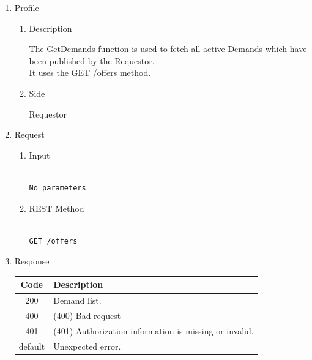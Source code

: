 \begin{enumerate}

\item Profile

\begin{enumerate}

\item Description

The GetDemands function is used to fetch all active Demands which have been published by the Requestor. \\ 
It uses the GET /offers method.

\item Side

Requestor

\end{enumerate}

\item Request

\begin{enumerate}

\item Input

\begin{tcolorbox}[boxrule=0pt, frame empty]
\begin{verbatim}

No parameters

\end{verbatim}
\end{tcolorbox}

\item REST Method

\begin{tcolorbox}[boxrule=0pt, frame empty]
\begin{verbatim} 

GET /offers

\end{verbatim}
\end{tcolorbox}

\end{enumerate}

\item Response

\begin{center}
\begin{tabular}{|c|l|} 
\hline
\rowcolor{lightgray}	Code 		& 	Description \\
\hline
200	 		&	Demand list. \\
\hline
400			&	(400) Bad request \\
\hline
401			&	(401) Authorization information is missing or invalid. \\
\hline
default		&	Unexpected error. \\
\hline
\end{tabular}
\end{center}



\end{enumerate}
